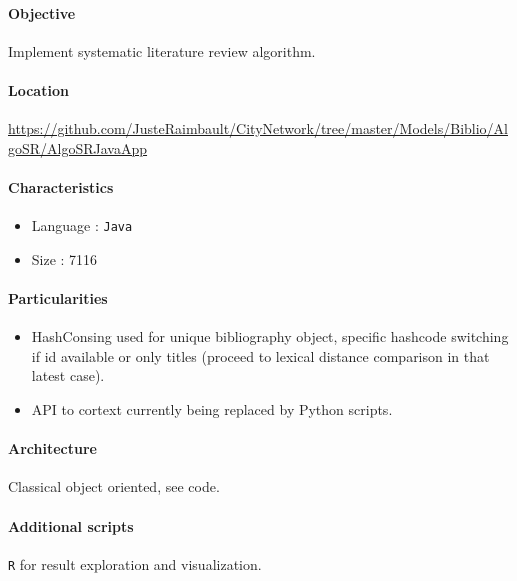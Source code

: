 \paragraph{Objective}

Implement systematic literature review algorithm.

\paragraph{Location}

\url{https://github.com/JusteRaimbault/CityNetwork/tree/master/Models/Biblio/AlgoSR/AlgoSRJavaApp}

\paragraph{Characteristics}

\begin{itemize}
\item Language : \texttt{Java}
\item Size : 7116
\end{itemize}

\paragraph{Particularities}

\begin{itemize}
\item HashConsing used for unique bibliography object, specific hashcode switching if id available or only titles (proceed to lexical distance comparison in that latest case).
\item API to cortext currently being replaced by Python scripts.
\end{itemize}

\paragraph{Architecture}

Classical object oriented, see code.

\paragraph{Additional scripts}

\texttt{R} for result exploration and visualization.



